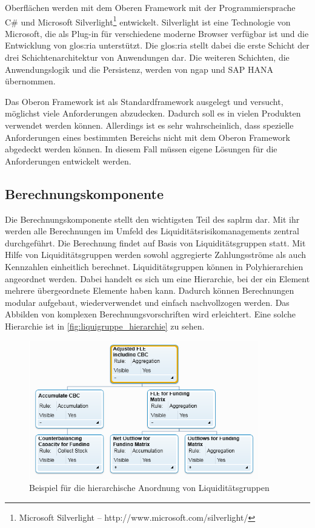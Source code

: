 \begin{onehalfspacing}
Oberflächen werden mit dem Oberen Framework mit der Programmiersprache C\# und Microsoft Silverlight\footnote{Microsoft Silverlight -- http://www.microsoft.com/silverlight/} entwickelt. Silverlight ist eine Technologie von Microsoft, die als Plug-in für verschiedene moderne Browser verfügbar ist und die Entwicklung von \gls{glos:ria} unterstützt. Die \gls{glos:ria} stellt dabei die erste Schicht der drei Schichtenarchitektur von Anwendungen dar. Die weiteren Schichten, die Anwendungslogik und die Persistenz, werden von \gls{ngap} und SAP HANA übernommen.

Das Oberon Framework ist als Standardframework ausgelegt und versucht, möglichst viele Anforderungen abzudecken. Dadurch soll es in vielen Produkten verwendet werden können. Allerdings ist es sehr wahrscheinlich, dass spezielle Anforderungen eines bestimmten Bereichs nicht mit dem Oberon Framework abgedeckt werden können. In diesem Fall müssen eigene Lösungen für die Anforderungen entwickelt werden.

\subsection{Berechnungskomponente}
\label{sec:berechnungskomponente}
Die Berechnungskomponente stellt den wichtigsten Teil des \gls{saplrm} dar. Mit ihr werden alle Berechnungen im Umfeld des Liquiditätsrisikomanagements zentral durchgeführt. Die Berechnung findet auf Basis von Liquiditätsgruppen statt. Mit Hilfe von Liquiditätsgruppen werden sowohl aggregierte Zahlungsströme als auch Kennzahlen einheitlich berechnet. Liquiditätsgruppen können in Polyhierarchien angeordnet werden. Dabei handelt es sich um eine Hierarchie, bei der ein Element mehrere übergeordnete Elemente haben kann. Dadurch können Berechnungen modular aufgebaut, wiederverwendet und einfach nachvollzogen werden. Das Abbilden von komplexen Berechnungsvorschriften wird erleichtert. Eine solche Hierarchie ist in \vref{fig:liquigruppe_hierarchie} zu sehen.

\begin{figure}[ht]
\centering
\setlength{\unitlength}{1mm}
\includegraphics[width=10cm]{images/liquigruppe_hierarchie.PNG}
\caption{
Beispiel für die hierarchische Anordnung von Liquiditätsgruppen
\label{fig:liquigruppe_hierarchie}}
\end{figure}


\end{onehalfspacing}
